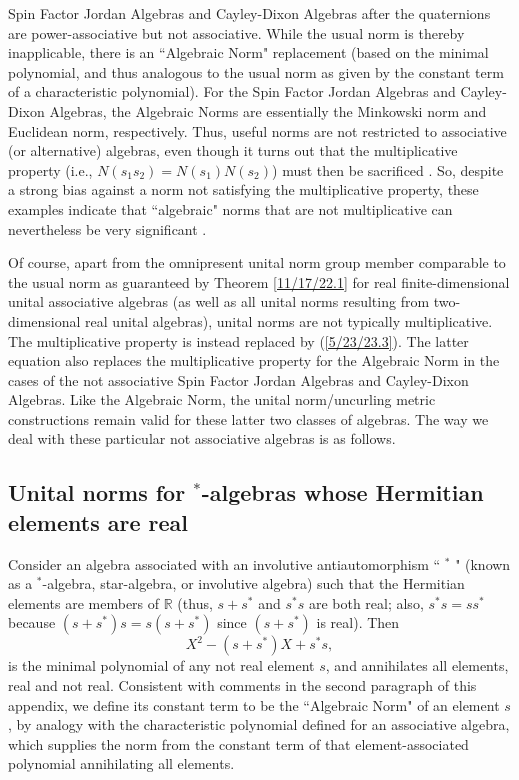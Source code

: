 \documentclass{amsart}
\theoremstyle{definition}
\numberwithin{theorem}{section}
\numberwithin{equation}{section}
\begin{document}
Spin Factor Jordan Algebras and Cayley-Dixon Algebras after the quaternions are power-associative but not associative.  While the usual norm is thereby inapplicable, there is an ``Algebraic Norm" replacement \cite{jacobson:1963} (based on the minimal polynomial, and thus analogous to the usual norm as given by the constant term of a characteristic polynomial).  For the Spin Factor Jordan Algebras and Cayley-Dixon Algebras, the Algebraic Norms are essentially the  Minkowski  norm and Euclidean norm, respectively.  Thus, useful norms are not restricted to associative (or alternative) algebras, even though it turns out that the multiplicative property (i.e., $N(s_1s_2)=N(s_1)N(s_2)$) must then be sacrificed  \cite{schafer:1963}. 
So, despite a strong bias against a norm not satisfying the multiplicative property, these examples indicate that ``algebraic" norms that are not multiplicative can nevertheless be very significant \cite{mccrimmon:2004}. 

Of course, apart from the omnipresent unital norm group member comparable to the usual norm as guaranteed by Theorem \ref{11/17/22.1} for real finite-dimensional unital associative algebras (as well as all unital norms resulting from two-dimensional real unital algebras), unital norms are not typically multiplicative.  The multiplicative property is instead replaced by (\ref{5/23/23.3}).  The latter equation also replaces the multiplicative property for the Algebraic Norm in the cases of the not associative Spin Factor Jordan Algebras and Cayley-Dixon Algebras. 
Like the Algebraic Norm, the unital norm/uncurling metric constructions remain valid for these latter two classes of algebras.  The way we deal with these particular not associative algebras is as follows.

\subsection{Unital norms for $^*$-algebras whose Hermitian elements are real} 

Consider an algebra associated with an involutive antiautomorphism ``
$^*$ " (known as a $^*$-algebra, star-algebra, or involutive algebra) such that the Hermitian elements are members of $\mathbb{R}$ (thus, $s+s^*$ and $s^*s$ are both real; also, $s^*s = ss^*$ because $(s+s^*)s = s(s+s^*)$ since $(s+s^*)$ is real). 
Then \[ X^2 - (s+s^*)X + s^*s, \] is the minimal polynomial of any not real element $s$, and annihilates all elements, real and not real.  Consistent with comments in the second paragraph of this appendix, we define its constant term to be the ``Algebraic Norm" of an element $s$, by analogy with the characteristic polynomial defined for an associative algebra, which supplies the norm from the constant term of that element-associated polynomial annihilating all elements.
\end{document}
